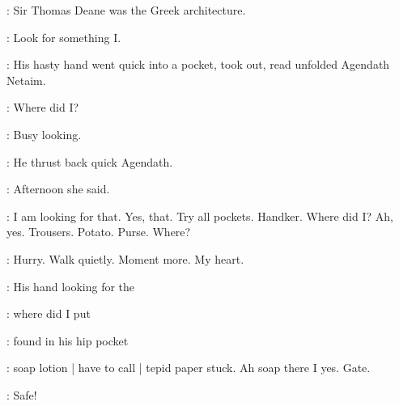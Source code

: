 \BloomInt:
Sir Thomas Deane was the Greek architecture.


\BloomInt:
Look for something I.

:
His hasty hand went quick into a pocket,
took out,
read unfolded Agendath Netaim.

\BloomInt:
Where did I?

\BloomInt:
Busy looking.

:
He thrust back quick Agendath.

\BloomInt:
Afternoon she said.

\BloomInt:
I am looking for that.
Yes, that.
Try all pockets.
Handker.
Where did I?
Ah, yes.
Trousers.
Potato.
Purse.
Where?

\BloomInt:
Hurry.
Walk quietly.
Moment more.
My heart.

:
His hand looking for the

\BloomInt:
where did I put

:
found in his hip pocket

\BloomInt:
soap lotion |
have to call |
tepid paper stuck.
Ah soap there I yes.
Gate.

\BloomInt:
Safe!


